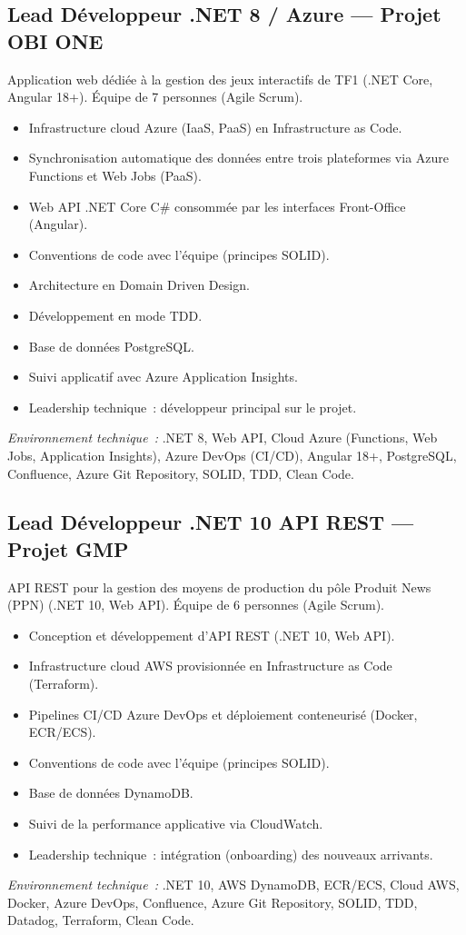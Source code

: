 \documentclass[10pt,a4paper]{article}
\begin{document}
\subsection*{Lead Développeur .NET 8 / Azure --- Projet OBI ONE}
\color{darkgray}
Application web dédiée à la gestion des jeux interactifs de TF1 (.NET Core, Angular 18+). Équipe de 7 personnes (Agile Scrum).
\begin{itemize}
  \item Infrastructure cloud Azure (IaaS, PaaS) en Infrastructure as Code.
  \item Synchronisation automatique des données entre trois plateformes via Azure Functions et Web Jobs (PaaS).
  \item Web API .NET Core C\# consommée par les interfaces Front-Office (Angular).
  \item Conventions de code avec l'équipe (principes SOLID).
  \item Architecture en Domain Driven Design.
  \item Développement en mode TDD.
  \item Base de données PostgreSQL.
  \item Suivi applicatif avec Azure Application Insights.
  \item Leadership technique~: développeur principal sur le projet.
\end{itemize}
\textit{Environnement technique~:} .NET 8, Web API, Cloud Azure (Functions, Web Jobs, Application Insights), Azure DevOps (CI/CD), Angular 18+, PostgreSQL, Confluence, Azure Git Repository, SOLID, TDD, Clean Code.

\vspace{6pt}

\subsection*{Lead Développeur .NET 10 API REST --- Projet GMP}
\color{darkgray}
API REST pour la gestion des moyens de production du pôle Produit News (PPN) (.NET 10, Web API). Équipe de 6 personnes (Agile Scrum).
\begin{itemize}
  \item Conception et développement d'API REST (.NET 10, Web API).
  \item Infrastructure cloud AWS provisionnée en Infrastructure as Code (Terraform).
  \item Pipelines CI/CD Azure DevOps et déploiement conteneurisé (Docker, ECR/ECS).
  \item Conventions de code avec l'équipe (principes SOLID).
  \item Base de données DynamoDB.
  \item Suivi de la performance applicative via CloudWatch.
  \item Leadership technique~: intégration (onboarding) des nouveaux arrivants.
\end{itemize}
\textit{Environnement technique~:} .NET 10, AWS DynamoDB, ECR/ECS, Cloud AWS, Docker, Azure DevOps, Confluence, Azure Git Repository, SOLID, TDD, Datadog, Terraform, Clean Code.
\end{document}

